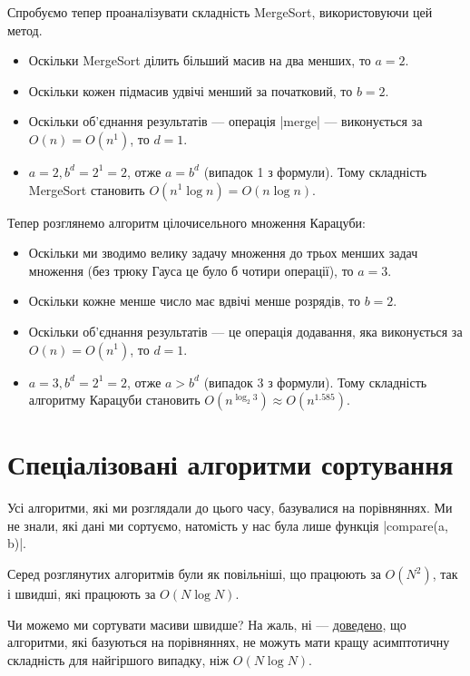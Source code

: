 \documentclass[12pt,a4paper]{report}
\begin{document}
Спробуємо тепер проаналізувати складність MergeSort, використовуючи цей метод.

\begin{itemize}
    \item Оскільки MergeSort ділить більший масив на два менших, то \(a = 2\).
    \item Оскільки кожен підмасив удвічі менший за початковий, то \(b = 2\).
    \item Оскільки об’єднання результатів --- операція |merge| --- виконується за \(O(n) = O(n ^ 1)\), то \(d = 1\).
    \item \(a = 2, b ^ d = 2 ^ 1 = 2\), отже \(a = b ^ d\) (випадок 1 з формули). Тому складність MergeSort становить \(O(n ^ 1 \log n) = O(n \log n)\).
\end{itemize}

Тепер розглянемо алгоритм цілочисельного множення Карацуби:

\begin{itemize}
    \item Оскільки ми зводимо велику задачу множення до трьох менших задач множення (без трюку Гауса це було б чотири операції), то \(a = 3\).
    \item Оскільки кожне менше число має вдвічі менше розрядів, то \(b = 2\).
    \item Оскільки об’єднання результатів --- це операція додавання, яка виконується за \(O(n) = O(n ^ 1)\), то \(d = 1\).
    \item \(a = 3, b ^ d = 2 ^ 1 = 2\), отже \(a > b ^ d\) (випадок 3 з формули). Тому складність алгоритму Карацуби становить \(O(n ^ {\log_2 3}) \approx O(n ^ {1.585}) \).
\end{itemize}



\section{Спеціалізовані алгоритми сортування}

Усі алгоритми, які ми розглядали до цього часу, базувалися на порівняннях. Ми не знали, які дані ми сортуємо, натомість у нас була лише функція |compare(a, b)|.

Серед розглянутих алгоритмів були як повільніші, що працюють за \(O(N^2)\), так і швидші, які працюють за \(O(N \log N)\).

Чи можемо ми сортувати масиви швидше? На жаль, ні --- \href{http://www.bowdoin.edu/~ltoma/teaching/cs231/fall07/Lectures/sortLB.pdf}{доведено}, що алгоритми, які базуються на порівняннях, не можуть мати кращу асимптотичну складність для найгіршого випадку, ніж \(O(N \log N)\).
\end{document}
